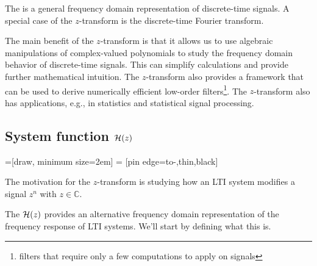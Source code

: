 The \emph{} is a general frequency
domain representation of discrete-time signals. A special case of the
$z$-transform is the discrete-time Fourier transform.

The main benefit of the $z$-transform is that it allows us to use
algebraic manipulations of complex-valued polynomials to study the
frequency domain behavior of discrete-time signals. This can simplify
calculations and provide further mathematical intuition. The
$z$-transform also provides a framework that can be used to derive
numerically efficient low-order filters\footnote{filters that require only a 
few computations to apply on signals}. The $z$-transform
also has applications, e.g., in statistics and statistical signal
processing.

\subsection{System function $\mathcal{H}(z)$}

=[draw, minimum size=2em]
 = [pin edge={to-,thin,black}]
\begin{marginfigure}
\begin{center}
\end{center}
\caption{The motivation for the $z$-transform is studying how an LTI system modifies a signal $z^n$ with $z\in \mathbb{C}$.}
\end{marginfigure}

The \emph{} $\mathcal{H}(z)$ provides an
alternative frequency domain representation of the frequency response
of LTI systems. We'll start by defining what this is.

